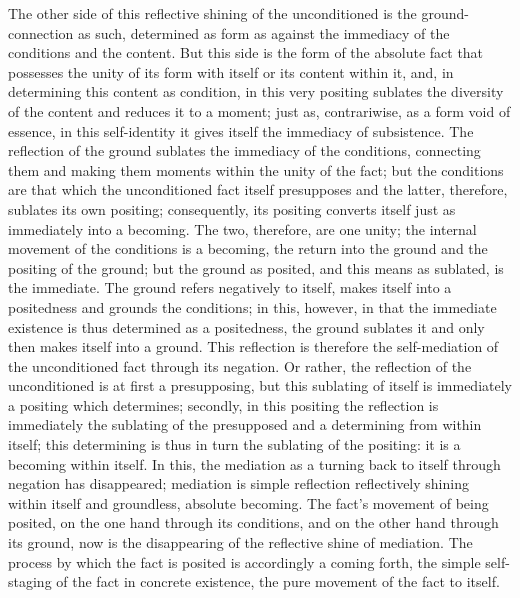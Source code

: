 The other side of this reflective shining of
the unconditioned is the ground-connection as such,
determined as form as against the immediacy
of the conditions and the content.
But this side is the form of the absolute fact
that possesses the unity of its form with itself
or its content within it,
and, in determining this content as condition,
in this very positing sublates the diversity of the content
and reduces it to a moment;
just as, contrariwise, as a form void of essence,
in this self-identity it gives itself the immediacy of subsistence.
The reflection of the ground sublates the immediacy of the conditions,
connecting them and making them moments within the unity of the fact;
but the conditions are that which
the unconditioned fact itself presupposes
and the latter, therefore, sublates its own positing;
consequently, its positing converts itself
just as immediately into a becoming.
The two, therefore, are one unity;
the internal movement of the conditions is a becoming,
the return into the ground and the positing of the ground;
but the ground as posited, and this means as sublated, is the immediate.
The ground refers negatively to itself,
makes itself into a positedness and grounds the conditions;
in this, however, in that the immediate existence is
thus determined as a positedness,
the ground sublates it and only then makes itself into a ground.
This reflection is therefore the self-mediation of
the unconditioned fact through its negation.
Or rather, the reflection of the unconditioned is at first a presupposing,
but this sublating of itself is immediately a positing which determines;
secondly, in this positing the reflection is immediately
the sublating of the presupposed
and a determining from within itself;
this determining is thus in turn the sublating of the positing:
it is a becoming within itself.
In this, the mediation as a turning back
to itself through negation has disappeared;
mediation is simple reflection
reflectively shining within itself
and groundless, absolute becoming.
The fact's movement of being posited,
on the one hand through its conditions,
and on the other hand through its ground,
now is the disappearing of the reflective shine of mediation.
The process by which the fact is posited is accordingly a coming forth,
the simple self-staging of the fact in concrete existence,
the pure movement of the fact to itself.

